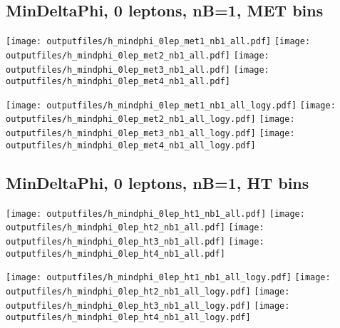 \documentclass[11pt]{article}
\begin{document}
    \clearpage


    \subsection{ MinDeltaPhi, 0 leptons, nB=1, MET bins }

    \noindent
     \texttt{[image: outputfiles/h\_mindphi\_0lep\_met1\_nb1\_all.pdf]}
     \texttt{[image: outputfiles/h\_mindphi\_0lep\_met2\_nb1\_all.pdf]}
     \texttt{[image: outputfiles/h\_mindphi\_0lep\_met3\_nb1\_all.pdf]}
     \texttt{[image: outputfiles/h\_mindphi\_0lep\_met4\_nb1\_all.pdf]}

    \noindent
     \texttt{[image: outputfiles/h\_mindphi\_0lep\_met1\_nb1\_all\_logy.pdf]}
     \texttt{[image: outputfiles/h\_mindphi\_0lep\_met2\_nb1\_all\_logy.pdf]}
     \texttt{[image: outputfiles/h\_mindphi\_0lep\_met3\_nb1\_all\_logy.pdf]}
     \texttt{[image: outputfiles/h\_mindphi\_0lep\_met4\_nb1\_all\_logy.pdf]}

    \clearpage



    \subsection{ MinDeltaPhi, 0 leptons, nB=1, HT bins }

    \noindent
     \texttt{[image: outputfiles/h\_mindphi\_0lep\_ht1\_nb1\_all.pdf]}
     \texttt{[image: outputfiles/h\_mindphi\_0lep\_ht2\_nb1\_all.pdf]}
     \texttt{[image: outputfiles/h\_mindphi\_0lep\_ht3\_nb1\_all.pdf]}
     \texttt{[image: outputfiles/h\_mindphi\_0lep\_ht4\_nb1\_all.pdf]}

    \noindent
     \texttt{[image: outputfiles/h\_mindphi\_0lep\_ht1\_nb1\_all\_logy.pdf]}
     \texttt{[image: outputfiles/h\_mindphi\_0lep\_ht2\_nb1\_all\_logy.pdf]}
     \texttt{[image: outputfiles/h\_mindphi\_0lep\_ht3\_nb1\_all\_logy.pdf]}
     \texttt{[image: outputfiles/h\_mindphi\_0lep\_ht4\_nb1\_all\_logy.pdf]}

    \clearpage
\end{document}
